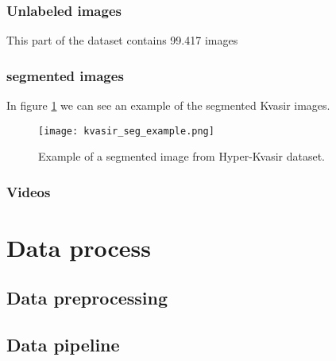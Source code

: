 \documentclass[thesis.tex]{subfiles}
\begin{document}

\subsubsection{Unlabeled images}
This part of the dataset contains 99.417 images

\subsubsection{segmented images}
In figure \ref{fig:kvasir_seg_example} we can see an example of the segmented Kvasir images.

\begin{figure}[H] %
  \begin{center}
    \texttt{[image: kvasir\_seg\_example.png]}
    \caption{Example of a segmented image from Hyper-Kvasir dataset.}
    \label{fig:kvasir_seg_example}
  \end{center}
\end{figure}


\subsubsection{Videos}




\section{Data process} \label{sec:data_pipeline}

\subsection{Data preprocessing}

\subsection{Data pipeline}


\end{document}
